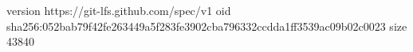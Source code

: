 version https://git-lfs.github.com/spec/v1
oid sha256:052bab79f42fe263449a5f283fe3902cba796332ccdda1ff3539ac09b02c0023
size 43840
